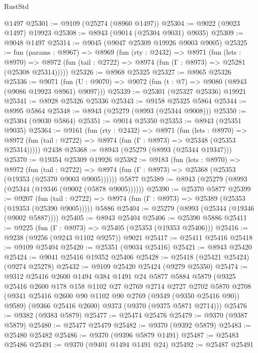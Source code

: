 \begin{lexlean}{RustStd}
\begin{coremodule}
{\begin{coremodule}
{{{{{{{{{{{{{{{{{{{{{{{{{{{{{{{{{{{{{{{    @1497
@25301 := @9109 (@25274 (@8960 @1497))
@25304 := @9022 (@9023 @1497) @19923
@25308 := @8943 (@9014 (@25304 @9031) @9035)
@25309 := @9048 @1497
@25314 := @9045 (@9047 @25309 @19926 @9003 @9005)
@25325 := fun (params : @8967) =>
  @8969
    (fun (rty : @2432) =>
    @8971
      (fun (lets : @8970) =>
      @8972 (fun (tail : @2722) => @8974 (fun (Γ : @8973) => @25281 (@25308 @25314)))))
@25326 := @8968 @25325
@25327 := @8965 @25326
@25336 := @9071
    (fun (U : @9070) => @9072 (fun (t : @7) => @9080 (@8943 (@9086 @19923 @8961) @9097)))
@25339 := @25301 (@25327 @25336) @19921
@25341 := @8928 @25326 @25336
@25343 := @9158 @25325 @5864
@25344 := @8995 @5864
@25348 := @8943 (@25279 (@8993 (@25344 @9008)))
@25350 := @25304 (@9030 @5864)
@25351 := @9014 @25350
@25353 := @8943 (@25351 @9035)
@25364 := @9161
    (fun (rty : @2432) =>
    @8971
      (fun (lets : @8970) =>
      @8972 (fun (tail : @2722) => @8974 (fun (Γ : @8973) => @25348 (@25353 @25314)))))
    @2438
@25368 := @8943 (@25279 (@8993 (@25344 @19347)))
@25370 := @19354 @25309 @19926
@25382 := @9183
    (fun (lets : @8970) =>
    @8972
      (fun (tail : @2722) =>
      @8974 (fun (Γ : @8973) => @25368 (@25353 (@19353 (@25370 @9003 @9005))))))
    @5877
@25389 := @8943 (@25279 (@8993 (@25344 (@19346 (@9002 (@5878 @9005))))))
@25390 := @25370 @5877
@25399 := @9207
    (fun (tail : @2722) => @8974 (fun (Γ : @8973) => @25389 (@25353 (@19353 (@25390 @9005)))))
    @5886
@25404 := @25279 (@8993 (@25344 (@19346 (@9002 @5887))))
@25405 := @8943 @25404
@25406 := @25390 @5886
@25411 := @9225 (fun (Γ : @8973) => @25405 (@25353 (@19353 @25406)))
@25416 := @9238 (@9256 (@9243 @1102 @9257)) @9021
@25417 := @25411 @25416
@25418 := @9109 @25404
@25420 := @25351 (@9034 @25416)
@25421 := @8943 @25420
@25424 := @9041 @25416 @19352 @25406
@25428 := @25418 (@25421 @25424) (@9274 @25278)
@25432 := @9109 @25420 @25424 (@9279 @25350)
@25474 := @9312
    @25416
    @2600
    @1494
    @384
    @1491
    @24
    @5877
    @5884
    @5879
    (@9325
      @25416
      @2600
      @178
      @158
      @1102
      @27
      @2769
      @2714
      @2727
      @2702
      @5870
      @2708
      (@9341 @25416 @2600 @90 @1102 @90 @2769 (@9349 (@9350 @25416 @90)) @9589)
      (@9366 @25416 @2600)
      @9373
      (@9370 (@9375 @5871 @2714)))
@25476 := @9382 (@9383 @5879)
@25477 := @25474 @25476
@25479 := @9370 (@9387 @5879)
@25480 := @25477 @25479
@25482 := @9370 (@9392 @5879)
@25483 := @25480 @25482
@25486 := @9370 (@9396 @5879 @1491)
@25487 := @25483 @25486
@25491 := @9370 (@9401 @1494 @1491 @24)
@25492 := @25487 @25491
}}}}}}}}}}}}}}}}}}}}}}}}}}}}}}}}}}}}}}}
\end{coremodule}}
\end{coremodule}
\end{lexlean}

